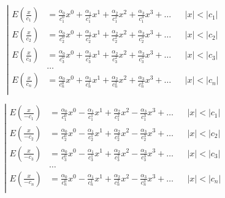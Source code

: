\begin{equation*} \left| \begin{aligned}
E{\left(\frac{x}{c_1} \right)} &=
  \frac{\alpha_0}{c_1^0} x^0
+ \frac{\alpha_1}{c_1^1} x^1
+ \frac{\alpha_2}{c_1^2} x^2
+ \frac{\alpha_3}{c_1^3} x^3
+ \ldots &
&|x| < |c_1| \\
%
E{\left(\frac{x}{c_2} \right)} &=
  \frac{\alpha_0}{c_2^0} x^0
+ \frac{\alpha_1}{c_2^1} x^1
+ \frac{\alpha_2}{c_2^2} x^2
+ \frac{\alpha_3}{c_2^3} x^3
+ \ldots &
&|x| < |c_2| \\
%
E{\left(\frac{x}{c_3} \right)} &=
  \frac{\alpha_0}{c_3^0} x^0
+ \frac{\alpha_1}{c_3^1} x^1
+ \frac{\alpha_2}{c_3^2} x^2
+ \frac{\alpha_3}{c_3^3} x^3
+ \ldots &
&|x| < |c_3| \\
%
&\ldots \\
%
E{\left(\frac{x}{c_n} \right)} &=
  \frac{\alpha_0}{c_n^0} x^0
+ \frac{\alpha_1}{c_n^1} x^1
+ \frac{\alpha_2}{c_n^2} x^2
+ \frac{\alpha_3}{c_n^3} x^3
+ \ldots &
&|x| < |c_n| \\
\end{aligned} \right. \end{equation*}

\begin{equation*} \left| \begin{aligned}
E{\left(\frac{x}{- c_1} \right)} &=
  \frac{\alpha_0}{c_1^0} x^0
- \frac{\alpha_1}{c_1^1} x^1
+ \frac{\alpha_2}{c_1^2} x^2
- \frac{\alpha_3}{c_1^3} x^3
+ \ldots &
&|x| < |c_1| \\
%
E{\left(\frac{x}{- c_2} \right)} &=
  \frac{\alpha_0}{c_2^0} x^0
- \frac{\alpha_1}{c_2^1} x^1
+ \frac{\alpha_2}{c_2^2} x^2
- \frac{\alpha_3}{c_2^3} x^3
+ \ldots &
&|x| < |c_2| \\
%
E{\left(\frac{x}{- c_3} \right)} &=
  \frac{\alpha_0}{c_3^0} x^0
- \frac{\alpha_1}{c_3^1} x^1
+ \frac{\alpha_2}{c_3^2} x^2
- \frac{\alpha_3}{c_3^3} x^3
+ \ldots &
&|x| < |c_3| \\
%
&\ldots \\
%
E{\left(\frac{x}{- c_n} \right)} &=
  \frac{\alpha_0}{c_n^0} x^0
- \frac{\alpha_1}{c_n^1} x^1
+ \frac{\alpha_2}{c_n^2} x^2
- \frac{\alpha_3}{c_n^3} x^3
+ \ldots &
&|x| < |c_n| \\
\end{aligned} \right. \end{equation*}


